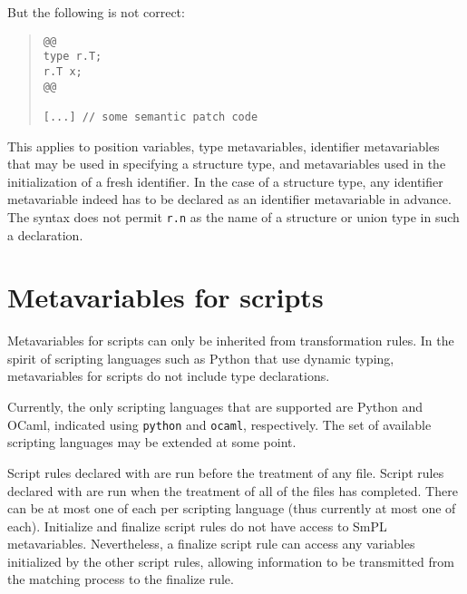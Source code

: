 \noindent
But the following is not correct:

\begin{quote}
\begin{verbatim}
@@
type r.T;
r.T x;
@@

[...] // some semantic patch code
\end{verbatim}
\end{quote}

This applies to position variables, type metavariables, identifier
metavariables that may be used in specifying a structure type, and
metavariables used in the initialization of a fresh identifier.  In the
case of a structure type, any identifier metavariable indeed has to be
declared as an identifier metavariable in advance.  The syntax does not
permit {\tt r.n} as the name of a structure or union type in such a
declaration.

\section{Metavariables for scripts}

Metavariables for scripts can only be inherited from transformation rules.
In the spirit of scripting languages such as Python that use dynamic
typing, metavariables for scripts do not include type declarations.

\begin{grammar}

    


\end{grammar}

Currently, the only scripting languages that are supported are Python and
OCaml, indicated using {\tt python} and {\tt ocaml}, respectively.  The
set of available scripting languages may be extended at some point.

Script rules declared with  are run before the treatment of
any file.  Script rules declared with  are run when the
treatment of all of the files has completed.  There can be at most one of
each per scripting language (thus currently at most one of each).
Initialize and finalize script rules do not have access to SmPL
metavariables.  Nevertheless, a finalize script rule can access any
variables initialized by the other script rules, allowing information to be
transmitted from the matching process to the finalize rule.

